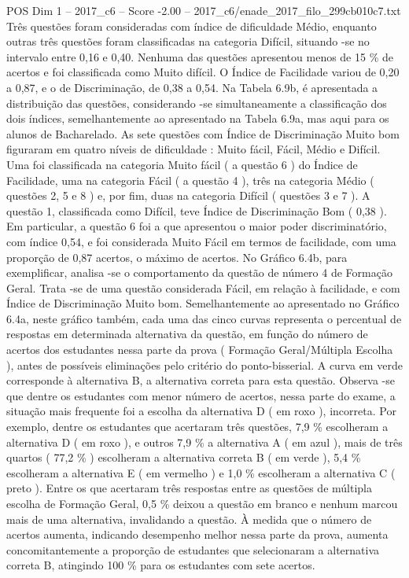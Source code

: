 \begin{textsample}{POS Dim 1 – 2017\_c6 – Score -2.00 – 2017\_c6/enade\_2017\_filo\_299cb010c7.txt}
Três questões foram consideradas com índice de dificuldade Médio, enquanto outras três questões foram classificadas na categoria Difícil, situando -se no intervalo entre 0,16 e 0,40.
Nenhuma das questões apresentou menos de 15 \% de acertos e foi classificada como Muito difícil.
O Índice de Facilidade variou de 0,20 a 0,87, e o de Discriminação, de 0,38 a 0,54.
Na Tabela 6.9b, é apresentada a distribuição das questões, considerando -se simultaneamente a classificação dos dois índices, semelhantemente ao apresentado na Tabela 6.9a, mas aqui para os alunos de Bacharelado.
As sete questões com Índice de Discriminação Muito bom figuraram em quatro níveis de dificuldade : Muito fácil, Fácil, Médio e Difícil.
Uma foi classificada na categoria Muito fácil ( a questão 6 ) do Índice de Facilidade, uma na categoria Fácil ( a questão 4 ), três na categoria Médio ( questões 2, 5 e 8 ) e, por fim, duas na categoria Difícil ( questões 3 e 7 ).
A questão 1, classificada como Difícil, teve Índice de Discriminação Bom ( 0,38 ).
Em particular, a questão 6 foi a que apresentou o maior poder discriminatório, com índice 0,54, e foi considerada Muito Fácil em termos de facilidade, com uma proporção de 0,87 acertos, o máximo de acertos.
No Gráfico 6.4b, para exemplificar, analisa -se o comportamento da questão de número 4 de Formação Geral.
Trata -se de uma questão considerada Fácil, em relação à facilidade, e com Índice de Discriminação Muito bom.
Semelhantemente ao apresentado no Gráfico 6.4a, neste gráfico também, cada uma das cinco curvas representa o percentual de respostas em determinada alternativa da questão, em função do número de acertos dos estudantes nessa parte da prova ( Formação Geral/Múltipla Escolha ), antes de possíveis eliminações pelo critério do ponto-bisserial.
A curva em verde corresponde à alternativa B, a alternativa correta para esta questão.
Observa -se que dentre os estudantes com menor número de acertos, nessa parte do exame, a situação mais frequente foi a escolha da alternativa D ( em roxo ), incorreta.
Por exemplo, dentre os estudantes que acertaram três questões, 7,9 \% escolheram a alternativa D ( em roxo ), e outros 7,9 \% a alternativa A ( em azul ), mais de três quartos ( 77,2 \% ) escolheram a alternativa correta B ( em verde ), 5,4 \% escolheram a alternativa E ( em vermelho ) e 1,0 \% escolheram a alternativa C ( preto ).
Entre os que acertaram três respostas entre as questões de múltipla escolha de Formação Geral, 0,5 \% deixou a questão em branco e nenhum marcou mais de uma alternativa, invalidando a questão.
À medida que o número de acertos aumenta, indicando desempenho melhor nessa parte da prova, aumenta concomitantemente a proporção de estudantes que selecionaram a alternativa correta B, atingindo 100 \% para os estudantes com sete acertos.

\end{textsample}

